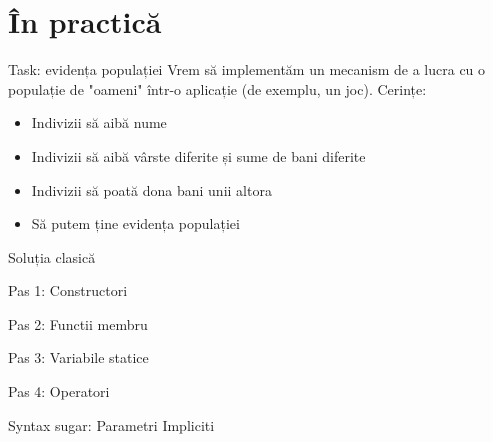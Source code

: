 \documentclass{beamer}
\begin{document}
\section{În practică}
    \frame{\tableofcontents[currentsection]}

    \begin{frame}{Task: evidența populației}
    Vrem să implementăm un mecanism de a lucra cu o populație de "oameni" într-o aplicație (de exemplu, un joc). \pause Cerințe: \pause 
    \begin{itemize}
    \setlength{\itemsep}{0.5cm}
    \item Indivizii să aibă nume \pause
    \item Indivizii să aibă vârste diferite și sume de bani diferite \pause
    \item Indivizii să poată dona bani unii altora \pause
    \item Să putem ține evidența populației 
    \end{itemize}
    \end{frame}

    \begin{frame}{Soluția clasică}
    \pause \\
    \end{frame}

    \begin{frame}{Pas 1: Constructori}
    \pause \\
    \end{frame}
    
    \begin{frame}{Pas 2: Functii membru}
    \pause \\
    \end{frame}
    
    \begin{frame}{Pas 3: Variabile statice}
    \pause \\
    \end{frame}
    
    \begin{frame}{Pas 4: Operatori}
    \pause \\
    \end{frame}
    
    \begin{frame}{Syntax sugar: Parametri Impliciti}
    \pause \\
    \end{frame}
\end{document}
